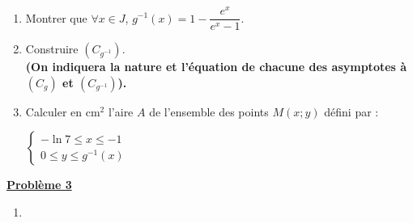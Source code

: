 \documentclass[12pt,a4paper]{article}
\newcommand{\exo}[1]{%
        \textbf{\underline{Problème #1}}
}
\begin{document}
\begin{multicols}{2}
\begin{enumerate}
    \item Montrer que \( \forall x \in J \), \( g^{-1}(x) = 1 - \dfrac{e^x}{e^x - 1} \).

    \item Construire \( (C_{g^{-1}}) \).\\
    \textbf{(On indiquera la nature et l’équation de chacune des asymptotes à \( (C_g) \) et \( (C_{g^{-1}}) \)).}
\item Calculer en \( \text{cm}^2 \) l’aire \( A \) de l’ensemble des points \( M(x ; y) \) défini par :

\(
\left\{
\begin{array}{l}
-\ln 7 \leq x \leq -1 \\
0 \leq y \leq g^{-1}(x)
\end{array}
\right.
\)

\end{enumerate}


\exo{3} 
\begin{enumerate}
    \item 
\end{enumerate}

\vspace{1em}

\end{multicols}
\end{document}
